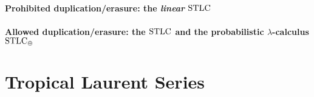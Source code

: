 \documentclass[a4paper,UKenglish,cleveref, autoref, thm-restate]{lipics-v2021}
\begin{document}
\paragraph*{Prohibited duplication/erasure: the \emph{linear} $\mathrm{STLC}$}\label{sec:3A}




\paragraph*{Allowed duplication/erasure: the $\mathrm{STLC}$ and the probabilistic $\lambda$-calculus $\mathrm{STLC}_\oplus$}\label{sec:STLC+STLCO}




\section{Tropical Laurent Series}\label{sec:tls}





\end{document}
